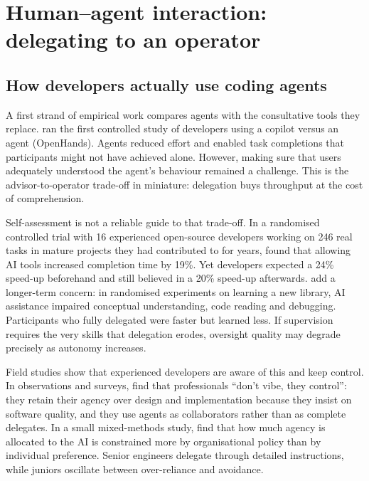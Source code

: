 \section{Human--agent interaction: delegating to an operator}
\label{sec:hai}

\subsection{How developers actually use coding agents}

A first strand of empirical work compares agents with the consultative tools they replace.
\citet{chen2025codewithme} ran the first controlled study of developers using a copilot versus an
agent (OpenHands). Agents reduced effort and enabled task completions that participants might not
have achieved alone. However, making sure that users adequately understood the agent's behaviour
remained a challenge.
This is the advisor-to-operator trade-off in miniature: delegation buys throughput at the cost of
comprehension.

Self-assessment is not a reliable guide to that trade-off. In a randomised controlled trial with 16
experienced open-source developers working on 246 real tasks in mature projects they had
contributed to for years,
\citet{becker2025measuring} found that allowing AI tools increased completion time by 19\%. Yet
developers expected a 24\% speed-up beforehand and still believed in a 20\% speed-up afterwards.
\citet{shen2026skill} add a longer-term concern: in randomised experiments on learning a new
library, AI assistance impaired conceptual understanding, code reading and debugging. Participants
who fully delegated were faster but learned less. If supervision requires the very skills that
delegation erodes, oversight quality may degrade precisely as autonomy increases.

Field studies show that experienced developers are aware of this and keep control. In observations
and surveys, \citet{huang2025dontvibe} find that professionals ``don't vibe, they control'': they
retain their agency over design and implementation because they insist on software quality, and they
use agents as collaborators rather than as complete delegates. In a small mixed-methods study, \citet{feng2026junior} find that how much agency is
allocated to the AI is constrained more by organisational policy than by individual preference.
Senior engineers delegate through detailed instructions, while juniors oscillate between over-reliance
and avoidance.

